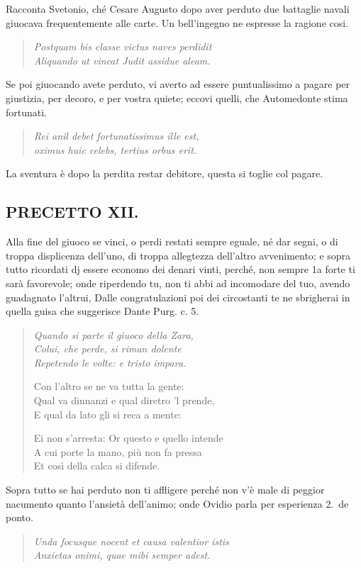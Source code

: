 \documentclass[11pt,a6paper]{article}
\newcommand{\literaryquote}[1]{%
\kern -6pt  \begin{verse}
    {\footnotesize \it #1}
  \end{verse}\kern -2pt%
}
\begin{document}
{Racconta Svetonio, ché Cesare Augusto dopo aver
perduto due battaglie navali giuocava frequentemente
alle carte. Un bell'ingegno ne espresse la ragione
cosi.
\literaryquote{Postquam bis classe victus naves perdidit\\
Aliquando ut vincat Judit assidue aleam.}

Se poi giuocando avete perduto, vi averto ad essere
puntualissimo a pagare per giustizia, per decoro,
e per vostra quiete; eccovi quelli, che Automedonte
stima fortunati.
\literaryquote{Rei anil debet fortunatissimus ille est, \\
oximus huic celebs, tertius orbus erit.}

La sventura è dopo la perdita restar debitore,
questa si toglie col pagare.
}


\subsection{PRECETTO XII.}

Alla fine del giuoco se vinci, o perdi restati
sempre eguale, né dar segni, o di
troppa displicenza dell'uno, di troppa allegtezza
dell'altro avvenimento; e sopra
tutto ricordati dj essere economo dei denari
vinti, perché, non sempre 1a forte ti sarà
favorevole; onde riperdendo tu, non ti abbi
ad incomodare del tuo, avendo guadagnato
l'altrui, Dalle congratulazioni poi dei circostanti
te ne sbrigherai in quella guisa che suggerisce Dante Purg. c. 5.
\literaryquote{
Quando si parte il giuoco della Zara,\\
Colui, che perde, si riman dolente\\
Repetendo le volte: e tristo impara.

Con l'altro se ne va tutta la gente:\\
Qual va dinnanzi e qual diretro 'l prende,\\
E qual da lato gli si reca a mente:

Ei non s'arresta: Or questo e quello intende\\
A cui porte la mano, più non fa pressa\\
Et così della calca si difende.\\}

Sopra tutto se hai perduto non ti affligere
perché non v'è male di peggior nacumento
quanto l'ansietà dell'animo; onde Ovidio
parla per esperienza 2.\ de ponto.

\literaryquote{Unda focusque nocent et causa valentior istis\\
Anxietas onimi, quae mibi semper adest.}
\end{document}

